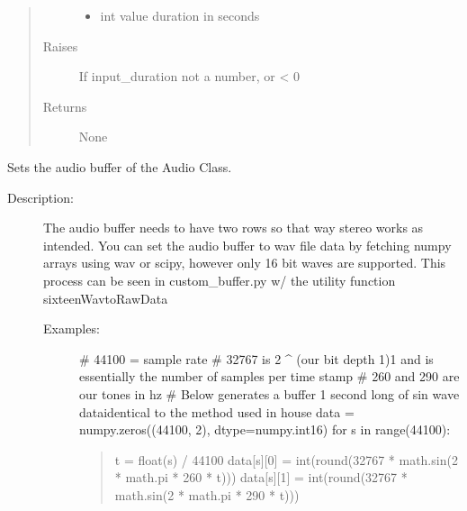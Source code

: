 \documentclass[letterpaper,10pt,english,openany,oneside]{sphinxmanual}
\begin{document}
\begin{fulllineitems}
\begin{fulllineitems}
\begin{quote}
\begin{description}
\begin{itemize}
\item {} 
\sphinxAtStartPar
{} \textendash{} int value \sphinxhyphen{} duration in seconds

\end{itemize}

\item[{Raises}] \leavevmode
\sphinxAtStartPar
{} \textendash{} If input\_duration not a number, or \textless{} 0

\item[{Returns}] \leavevmode
\sphinxAtStartPar
None

\end{description}\end{quote}

\end{fulllineitems}


\begin{fulllineitems}
\label{\detokenize{dpav:dpav.audio.Audio.set_audio_buffer}}
\sphinxAtStartPar
Sets the audio buffer of the Audio Class.
\begin{description}
\item[{Description:}] \leavevmode
\sphinxAtStartPar
The audio buffer needs to have two rows so that way stereo works as intended.
You can set the audio buffer to wav file data by fetching numpy arrays using wav or scipy,
however only 16 bit waves are supported. This process can be seen in custom\_buffer.py w/ the
utility function sixteenWavtoRawData
\begin{description}
\item[{Examples:}] \leavevmode
\sphinxAtStartPar
\# 44100 = sample rate
\# 32767 is 2 \textasciicircum{} (our bit depth \sphinxhyphen{}1)\sphinxhyphen{}1 and is essentially the number of samples per time stamp
\# 260 and 290 are our tones in hz
\# Below generates a buffer 1 second long of sin wave data\sphinxhyphen{}identical to the method used in house
data = numpy.zeros((44100, 2), dtype=numpy.int16)
for s in range(44100):
\begin{quote}

\sphinxAtStartPar
t = float(s) / 44100
data{[}s{]}{[}0{]} = int(round(32767 * math.sin(2 * math.pi * 260 * t)))
data{[}s{]}{[}1{]} = int(round(32767 * math.sin(2 * math.pi * 290 * t)))
\end{quote}


\end{description}
\end{description}
\end{fulllineitems}
\end{fulllineitems}
\end{document}
